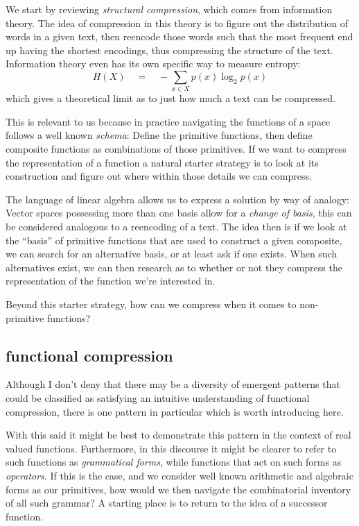 \documentclass[twoside]{article}
\begin{document}
We start by reviewing \emph{structural compression}, which comes from information theory. The idea of compression
in this theory is to figure out the distribution of words in a given text, then reencode those words such that
the most frequent end up having the shortest encodings, thus compressing the structure of the text. Information
theory even has its own specific way to measure entropy:
$$ H(X)\quad=\quad -\sum_{x\in X}p(x)\log_2 p(x) $$
which gives a theoretical limit as to just how much a text can be compressed.

This is relevant to us because in practice navigating the functions of a space follows a well known \emph{schema}:
Define the primitive functions, then define composite functions as combinations of those primitives. If we want
to compress the representation of a function a natural starter strategy is to look at its construction and figure
out where within those details we can compress.

The language of linear algebra allows us to express a solution by way of analogy: Vector spaces possessing more
than one basis allow for a \emph{change of basis}, this can be considered analogous to a reencoding of a text.
The idea then is if we look at the ``basis'' of primitive functions that are used to construct a given composite,
we can search for an alternative basis, or at least ask if one exists. When such alternatives exist, we can
then research as to whether or not they compress the representation of the function we're interested in.

Beyond this starter strategy, how can we compress when it comes to non-primitive functions?

\subsection*{functional compression}

Although I don't deny that there may be a diversity of emergent patterns that could be classified as satisfying
an intuitive understanding of functional compression, there is one pattern in particular which is worth introducing
here.

With this said it might be best to demonstrate this pattern in the context of real valued functions. Furthermore,
in this discourse it might be clearer to refer to such functions as \emph{grammatical forms}, while functions that
act on such forms as \emph{operators}. If this is the case, and we consider well known arithmetic and algebraic forms
as our primitives, how would we then navigate the combinatorial inventory of all such grammar? A starting place is
to return to the idea of a successor function.
\end{document}
